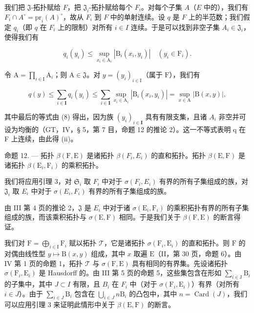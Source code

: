 我们把 \(\mathfrak{J}\)-拓扑赋给 \(F\)，把 \(\mathfrak{J}_i\)-拓扑赋给每个 \(F_i\)。对每个子集 \(A\)（\(E\) 中的），我们有 \(F_i \cap A^\circ = \text{pr}_i(A)^\circ\)，故从 \(F_i\) 到 \(F\) 中的单射连续。设 \(q\) 是 \(F\) 上的半范数；我们假定 \(q_i\)（即 \(q\) 在 \(F_i\) 上的限制）对所有 \(i \in I\) 连续。于是可以找到非空子集 \(A_i \in \mathfrak{J}_i\)，使得我们有

\[
q _ {i} \left(y _ {i}\right) \leqslant \sup _ {x _ {i} \in \mathrm{A} _ {i}} \left| \mathrm{B} _ {i} \left(x _ {i}, y _ {i}\right) \right| \quad \left(y _ {i} \in \mathrm{F} _ {i}\right).\tag{9}
\]

令 \(\mathrm{A} = \prod_{i\in \mathrm{I}}\mathrm{A}_i\)；则 \(\mathrm{A}\in \mathfrak{J}\)。对 \(y = (y_i)_{i\in \mathrm{I}}\)（属于 \(\mathrm{F}\)），我们有

\[
q (y) \leqslant \sum_ {i \in \mathbf {I}} q _ {i} (y _ {i}) \leqslant \sum_ {i \in \mathbf {I}} \sup _ {x _ {i} \in \mathrm{A} _ {i}} | \mathrm{B} _ {i} (x _ {i}, y _ {i}) | = \sup _ {x \in \mathrm{A}} | \mathrm{B} (x, y) |,
\]

其中最后的等式由 (8) 得出，因为族 \((y_{i})_{i\in\mathbf{I}}\) 具有有限支集，且诸 \(A_{i}\) 非空并可设为均衡的（GT，IV，§ 5，第 7 目，命题 12 的推论 2）。这一不等式表明 q 在 F 上连续，由此得 (ii)。

命题 12. --- 拓扑 \(\beta(\mathrm{F},\mathrm{E})\) 是诸拓扑 \(\beta(F_i,E_i)\) 的直和拓扑。拓扑 \(\beta(\mathrm{E},\mathrm{F})\) 是诸拓扑 \(\beta(\mathrm{E}_i,\mathrm{F}_i)\) 的乘积拓扑。

我们将应用引理 3，对 \(\mathfrak{S}_i\) 取 \(F_i\) 中对于 \(\sigma(F_i, E_i)\) 有界的所有子集组成的族，对 \(\mathfrak{J}_i\) 取 \(E_i\) 中对于 \(\sigma(E_i, F_i)\) 有界的所有子集组成的族。

由 III 第 4 页的推论 2，\(\mathfrak{J}\) 是 \(E_{i}\) 中对于诸 \(\sigma(\mathrm{E}_{i}, \mathrm{F}_{i})\) 的乘积拓扑有界的所有子集组成的族，而该乘积拓扑与 \(\sigma(\mathrm{E}, \mathrm{F})\) 相同。于是我们关于 \(\beta(\mathrm{F}, \mathrm{E})\) 的断言得证。

我们对 \(\mathrm{F} = \bigoplus_{i\in \mathrm{I}}\mathrm{F}_i\) 赋以拓扑 \(\mathcal{T}\)，它是诸拓扑 \(\sigma (\mathrm{F}_i,\mathrm{E}_i)\) 的直和拓扑。则 \(\mathrm{F}\) 的对偶由线性型 \(y\mapsto \mathrm{B}(x,y)\) 组成，其中 \(x\) 取遍 \(\mathrm{E}\)（II，第 30 页，命题 6）。由 IV 第 1 页的命题 1，拓扑 \(\mathcal{T}\) 与 \(\sigma (\mathrm{F},\mathrm{E})\) 具有相同的有界集。先设诸拓扑 \(\sigma (\mathrm{F}_i,\mathrm{E}_i)\) 是 Hausdorff 的。由 III 第 5 页的命题 5，这些集包含在形如 \(\sum_{i\in \mathrm{J}}\mathrm{B}_i\) 的子集中，其中 \(J\subset I\) 有限，且 \(B_{i}\) 在 \(F_{i}\) 中（对于 \(\sigma (\mathrm{F}_i,\mathrm{E}_i)\)）有界（对所有 \(i\in J\)）。由于 \(\sum_{i\in J}\mathrm{B}_{i}\) 包含在 \(\bigcup_{i\in J}n\mathrm{B}_{i}\) 的凸包中，其中 \(n = \operatorname {Card}(J)\)，我们可以应用引理 3 来证明此情形中关于 \(\beta (\mathrm{E},\mathrm{F})\) 的断言。

